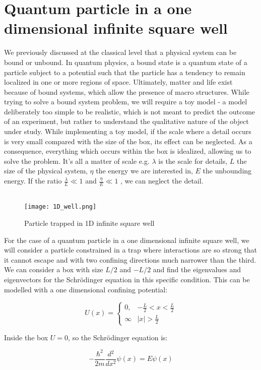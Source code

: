 \section{Quantum particle in a one dimensional infinite square well}
We previously discussed at the classical level that a physical system can be bound or unbound.
In quantum physics, a bound state is a quantum state of a particle subject to a potential such that the particle has a tendency to remain localized in one or more regions of space.
Ultimately, matter and life exist because of bound systems, which allow the presence of macro structures.
While trying to solve a bound system problem, we will require a toy model - a model deliberately too simple to be realistic, which is not meant to predict the outcome of an experiment, but rather to understand the qualitative nature of the object under study.
While implementing a toy model, if the scale where a detail occurs is very small compared with the size of the box, its effect can be neglected.
As a consequence, everything which occurs within the box is idealized, allowing us to solve the problem.
It's all a matter of scale e.g. $\lambda$ is the scale for details, $L$ the size of the physical system, $\eta$ the energy we are interested in, $E$ the unbounding energy.
If the ratio $\frac{\lambda}{L}\ll1$ and $\frac{\eta}{E}\ll1$ , we can neglect the detail.\\
\\
\begin{figure}[h!]
    \centering
    \texttt{[image: 1D\_well.png]}
    \caption{\label{fig:1D_well} Particle trapped in 1D infinite square well}
\end{figure}
\noindent
For the case of a quantum particle in a one dimensional infinite square well, we will consider a particle constrained in a trap where interactions are so strong that it cannot escape and with two confining directions much narrower than the third.
We can consider a box with size $L/2$ and $-L/2$ and find the eigenvalues and eigenvectors for the Schr\"odinger equation in this specific condition.
This can be modelled with a one dimensional confining potential:

$$U(x) = \begin{cases} 0, &-\frac{L}{2}<x<\frac{L}{2}\\\infty &|x|>\frac{L}{2}\end{cases}$$

Inside the box $U=0$, so the Schr\"odinger equation is:

$$-\frac{\hbar^2}{2m}\frac{d{^2}}{d{x^2}}\psi(x) = E\psi(x)$$

